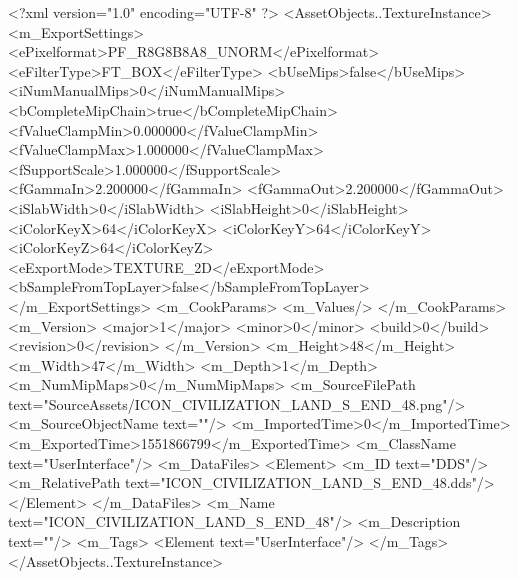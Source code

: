 <?xml version="1.0" encoding="UTF-8" ?>
<AssetObjects..TextureInstance>
	<m_ExportSettings>
		<ePixelformat>PF_R8G8B8A8_UNORM</ePixelformat>
		<eFilterType>FT_BOX</eFilterType>
		<bUseMips>false</bUseMips>
		<iNumManualMips>0</iNumManualMips>
		<bCompleteMipChain>true</bCompleteMipChain>
		<fValueClampMin>0.000000</fValueClampMin>
		<fValueClampMax>1.000000</fValueClampMax>
		<fSupportScale>1.000000</fSupportScale>
		<fGammaIn>2.200000</fGammaIn>
		<fGammaOut>2.200000</fGammaOut>
		<iSlabWidth>0</iSlabWidth>
		<iSlabHeight>0</iSlabHeight>
		<iColorKeyX>64</iColorKeyX>
		<iColorKeyY>64</iColorKeyY>
		<iColorKeyZ>64</iColorKeyZ>
		<eExportMode>TEXTURE_2D</eExportMode>
		<bSampleFromTopLayer>false</bSampleFromTopLayer>
	</m_ExportSettings>
	<m_CookParams>
		<m_Values/>
	</m_CookParams>
	<m_Version>
		<major>1</major>
		<minor>0</minor>
		<build>0</build>
		<revision>0</revision>
	</m_Version>
	<m_Height>48</m_Height>
	<m_Width>47</m_Width>
	<m_Depth>1</m_Depth>
	<m_NumMipMaps>0</m_NumMipMaps>
	<m_SourceFilePath text="SourceAssets/ICON_CIVILIZATION_LAND_S_END_48.png"/>
	<m_SourceObjectName text=""/>
	<m_ImportedTime>0</m_ImportedTime>
	<m_ExportedTime>1551866799</m_ExportedTime>
	<m_ClassName text="UserInterface"/>
	<m_DataFiles>
		<Element>
			<m_ID text="DDS"/>
			<m_RelativePath text="ICON_CIVILIZATION_LAND_S_END_48.dds"/>
		</Element>
	</m_DataFiles>
	<m_Name text="ICON_CIVILIZATION_LAND_S_END_48"/>
	<m_Description text=""/>
	<m_Tags>
		<Element text="UserInterface"/>
	</m_Tags>
</AssetObjects..TextureInstance>

